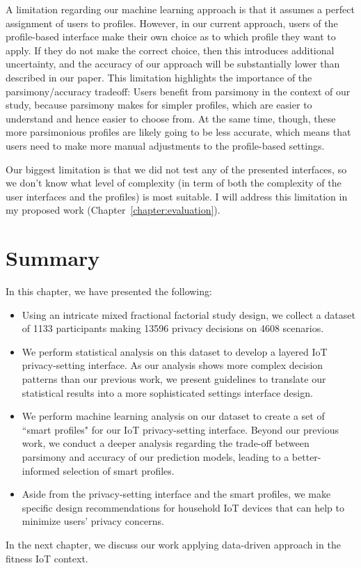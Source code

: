 A limitation regarding our machine learning approach is that it assumes a perfect assignment of users to profiles. However, in our current approach, users of the profile-based interface make their own choice as to which profile they want to apply. If they do not make the correct choice, then this introduces additional uncertainty, and the accuracy of our approach will be substantially lower than described in our paper. This limitation highlights the importance of the parsimony/accuracy tradeoff: Users benefit from parsimony in the context of our study, because parsimony makes for simpler profiles, which are easier to understand and hence easier to choose from. At the same time, though, these more parsimonious profiles are likely going to be less accurate, which means that users need to make more manual adjustments to the profile-based settings.

Our biggest limitation is that we did not test any of the presented interfaces, so we don’t know what level of complexity (in term of both the complexity of the user interfaces and the profiles) is most suitable. I will address this limitation in my proposed work (Chapter~\ref{chapter:evaluation}).

\section{Summary}
In this chapter, we have presented the following:
\begin{itemize}
	\item Using an intricate mixed fractional factorial study design, we collect a dataset of 1133 participants making 13596 privacy decisions on 4608 scenarios.
	\item We perform statistical analysis on this dataset to develop a layered IoT privacy-setting interface. As our analysis shows more complex decision patterns than our previous work, we present guidelines to translate our statistical results into a more sophisticated settings interface design.
	\item We perform machine learning analysis on our dataset to create a set of ``smart profiles" for our IoT privacy-setting interface. Beyond our previous work, we conduct a deeper analysis regarding the trade-off between parsimony and accuracy of our prediction models, leading to a better-informed selection of smart profiles.
	\item Aside from the privacy-setting interface and the smart profiles, we make specific design recommendations for household IoT devices that can help to minimize users' privacy concerns. 
\end{itemize}

In the next chapter, we discuss our work applying data-driven approach in the fitness IoT context. 